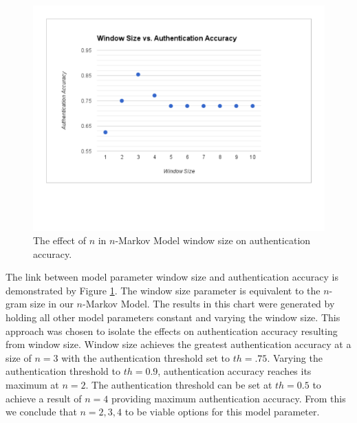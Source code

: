 \documentclass{acm_proc_article-sp}
\begin{document}
\begin{figure}
\centering
\includegraphics[width=.45\textwidth]{window_size_vs_authentication_accuracy.pdf}
\caption{The effect of $n$ in $n$-Markov Model window size on authentication accuracy.}
\label{fig:window_size_vs_authentication_accuracy}
\end{figure}

The link between model parameter window size and authentication accuracy is demonstrated by Figure \ref{fig:window_size_vs_authentication_accuracy}.
The window size parameter is equivalent to the $n$-gram size in our $n$-Markov Model.
The results in this chart were generated by 
holding all other model parameters constant and varying the window size. 
This approach was chosen to isolate the effects on 
authentication accuracy resulting from window size.
Window size achieves the greatest authentication accuracy at a size of $n=3$ with the authentication threshold set to $th=.75$.
Varying the authentication threshold to $th=0.9$, authentication accuracy reaches its maximum at $n=2$. 
The authentication threshold can be set at $th=0.5$ to achieve a result of $n=4$ providing maximum authentication accuracy.
From this we conclude that $n={2,3,4}$ to be viable options for this model parameter.

\end{document}
